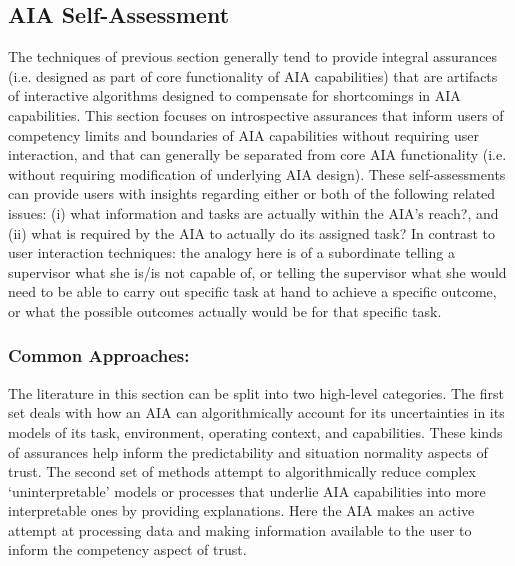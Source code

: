 \subsection{AIA Self-Assessment} \label{sec:aia_self_assessment}

The techniques of previous section generally tend to provide integral assurances (i.e. designed as part of core functionality of AIA capabilities) that are artifacts of interactive algorithms designed to compensate for shortcomings in AIA capabilities. This section focuses on introspective assurances that inform users of competency limits and boundaries of AIA capabilities without requiring user interaction, and that can generally be separated from core AIA functionality (i.e. without requiring modification of underlying AIA design).  These self-assessments can provide users with insights regarding either or both of the following related issues: (i) what information and tasks are actually within the AIA's reach?, and (ii) what is required by the AIA to actually do its assigned task? 
In contrast to user interaction techniques: the analogy here is of a subordinate telling a supervisor what she is/is not capable of, or telling the supervisor what she would need to be able to carry out specific task at hand to achieve a specific outcome, or what the possible outcomes actually would be for that specific task. 


\subsubsection{Common Approaches:}
The literature in this section can be split into two high-level categories. 
The first set deals with how an AIA can algorithmically account for its uncertainties in its models of its task, environment, operating context, and capabilities. 
These kinds of assurances help inform the predictability and situation normality aspects of trust. 
The second set of methods attempt to algorithmically reduce complex `uninterpretable' models or processes that underlie AIA capabilities into more interpretable ones by providing explanations. 
Here the AIA makes an active attempt at processing data and making information available to the user to inform the competency aspect of trust. %

